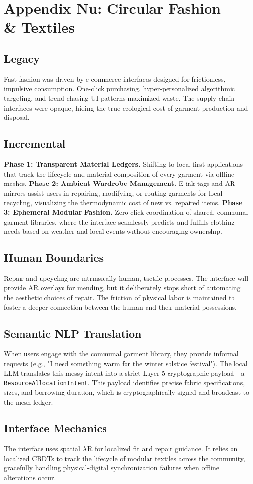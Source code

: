 \chapter{Appendix Nu: Circular Fashion \\\& Textiles}

\section{Legacy}
Fast fashion was driven by e-commerce interfaces designed for frictionless, impulsive consumption. One-click purchasing, hyper-personalized algorithmic targeting, and trend-chasing UI patterns maximized waste. The supply chain interfaces were opaque, hiding the true ecological cost of garment production and disposal.

\section{Incremental}
\textbf{Phase 1: Transparent Material Ledgers.} Shifting to local-first applications that track the lifecycle and material composition of every garment via offline meshes.
\textbf{Phase 2: Ambient Wardrobe Management.} E-ink tags and AR mirrors assist users in repairing, modifying, or routing garments for local recycling, visualizing the thermodynamic cost of new vs. repaired items.
\textbf{Phase 3: Ephemeral Modular Fashion.} Zero-click coordination of shared, communal garment libraries, where the interface seamlessly predicts and fulfills clothing needs based on weather and local events without encouraging ownership.

\section{Human Boundaries}
Repair and upcycling are intrinsically human, tactile processes. The interface will provide AR overlays for mending, but it deliberately stops short of automating the aesthetic choices of repair. The friction of physical labor is maintained to foster a deeper connection between the human and their material possessions.

\section{Semantic NLP Translation}
When users engage with the communal garment library, they provide informal requests (e.g., "I need something warm for the winter solstice festival"). The local LLM translates this messy intent into a strict Layer 5 cryptographic payload—a \texttt{ResourceAllocationIntent}. This payload identifies precise fabric specifications, sizes, and borrowing duration, which is cryptographically signed and broadcast to the mesh ledger.

\section{Interface Mechanics}
The interface uses spatial AR for localized fit and repair guidance. It relies on localized CRDTs to track the lifecycle of modular textiles across the community, gracefully handling physical-digital synchronization failures when offline alterations occur.
